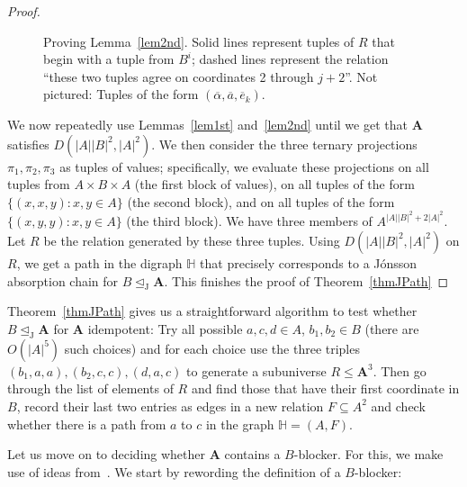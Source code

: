 \documentclass{amsart}
\theoremstyle{plain}
\theoremstyle{definition}
\begin{document}
\begin{proof}
\begin{figure}
\begin{center}
  \end{center}
  \caption{Proving Lemma~\ref{lem2nd}. Solid lines represent tuples of $R$ that
    begin with a tuple from $B^{i}$; dashed lines represent the relation
    ``these two tuples agree on coordinates 2 through $j+2$''. Not pictured:
  Tuples of the form $({\overline{\alpha}},{\overline{a}},{\overline{e}}_k)$.}
  \label{figlem2nd}
\end{figure}

We now repeatedly use Lemmas~\ref{lem1st} and~\ref{lem2nd} until we get that
${{\mathbf{A}}}$ satisfies $D(|A||B|^2,|A|^2)$. We then consider the three ternary projections
$\pi_1,\pi_2,\pi_3$ as tuples of values; specifically, we evaluate these
projections on all tuples from $A\times B\times A$ (the first block of values), on
all tuples of the form $\{(x,x,y)\colon x,y\in A\}$ (the second block), and on all
tuples of the form $\{(x,y,y)\colon x,y\in A\}$ (the third block). We have three
members of $A^{|A||B|^2+2|A|^2}$. Let $R$ be the relation generated by these
three tuples. Using $D(|A||B|^2,|A|^2)$ on $R$,
we get a path in the digraph ${\mathbb{H}}$ that precisely corresponds to a J\'onsson absorption chain for $B \operatorname{\trianglelefteq_J} {{\mathbf{A}}}$.  
This finishes the proof of Theorem~\ref{thmJPath}
\end{proof}

\bigskip

Theorem~\ref{thmJPath} gives us a straightforward algorithm to test whether
$B\operatorname{\trianglelefteq_J}{{\mathbf{A}}}$ for ${{\mathbf{A}}}$ idempotent: Try all possible $a,c,d\in A$,
$b_1,b_2\in B$ (there are $O(|A|^5)$ such choices) and for each choice use the
three triples $(b_1,a,a), (b_2,c,c), (d,a,c)$ to generate a subuniverse
$R\leq {{\mathbf{A}}}^3$. Then go through the list of elements of $R$ and find those that have
their first coordinate in $B$, record their last two entries as edges in 
a new relation $F \subseteq A^2$ and check whether there is a path from $a$ to $c$ in 
the graph ${\mathbb{H}}=(A,F)$. 

Let us move on to deciding whether ${{\mathbf{A}}}$ contains a $B$-blocker. For this, we make
use of ideas from~\cite{markovic-maroti-mckenzie-blockers}. We start by rewording the
definition of a $B$-blocker:
\end{document}
